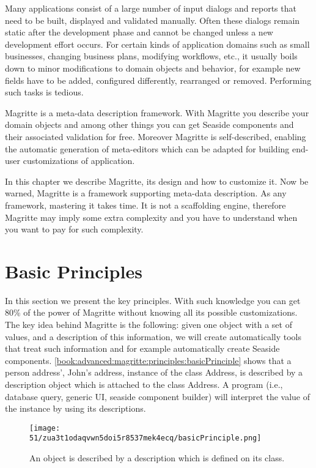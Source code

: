 \documentclass[a4paper,10pt,twoside]{book}
\begin{document}
Many applications consist of a large number of input dialogs and reports that need to be built, displayed and validated manually. Often these dialogs remain static after the development phase and cannot be changed unless a new development effort occurs. For certain kinds of application domains such as small businesses, changing business plans, modifying workflows, etc., it usually boils down to minor modifications to domain objects and behavior, for example new fields have to be added, configured differently, rearranged or removed. Performing such tasks is tedious.

Magritte is a meta-data description framework. With Magritte you describe your domain objects and among other things you can get Seaside components and their associated validation for free. Moreover Magritte is self-described, enabling the automatic generation of meta-editors which can be adapted for building end-user customizations of application.

In this chapter we describe Magritte, its design and how to customize it. Now be warned, Magritte is a framework supporting meta-data description. As any framework, mastering it takes time. It is not a scaffolding engine, therefore Magritte may imply some extra complexity and you have to understand when you want to pay for such complexity.

\section{Basic Principles}
\label{book:advanced:magritte:principles}

In this section we present the key principles. With such knowledge you can get 80\% of the power of Magritte without knowing all its possible customizations. The key idea behind Magritte is the following: given one object with a set of values, and a description of this information, we will create automatically tools that treat such information and for example automatically create Seaside components. \autoref{book:advanced:magritte:principles:basicPrinciple} shows that a person address', John's address, instance of the class Address, is described by a description object which is attached to the class Address. A program (i.e., database query, generic UI, seaside component builder) will interpret the value of the instance by using its descriptions.

\begin{figure}[h!tbp]
	\begin{center}
		\texttt{[image: 51/zua3t1odaqvwn5doi5r8537mek4ecq/basicPrinciple.png]}
		\caption{An object is described by a description which is defined on its class.\label{book:advanced:magritte:principles:basicPrinciple}}
	\end{center}
\end{figure}
\end{document}
